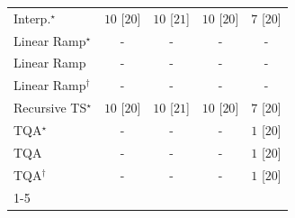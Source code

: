 \begin{tabular}{l|cccc|}
Interp.$^\star$ & {\cellcolor[HTML]{00441B}} \color[HTML]{F1F1F1} $10$ [$20$] & {\cellcolor[HTML]{00441B}} \color[HTML]{F1F1F1} $10$ [$21$] & {\cellcolor[HTML]{00441B}} \color[HTML]{F1F1F1} $10$ [$20$] & {\cellcolor[HTML]{37A055}} \color[HTML]{F1F1F1} $7$ [$20$] \\
Linear Ramp$^\star$ & {\cellcolor[HTML]{000000}} \color[HTML]{F1F1F1} {\cellcolor{white}} \color{black} - & {\cellcolor[HTML]{000000}} \color[HTML]{F1F1F1} {\cellcolor{white}} \color{black} - & {\cellcolor[HTML]{000000}} \color[HTML]{F1F1F1} {\cellcolor{white}} \color{black} - & {\cellcolor[HTML]{000000}} \color[HTML]{F1F1F1} {\cellcolor{white}} \color{black} - \\
Linear Ramp & {\cellcolor[HTML]{000000}} \color[HTML]{F1F1F1} {\cellcolor{white}} \color{black} - & {\cellcolor[HTML]{000000}} \color[HTML]{F1F1F1} {\cellcolor{white}} \color{black} - & {\cellcolor[HTML]{000000}} \color[HTML]{F1F1F1} {\cellcolor{white}} \color{black} - & {\cellcolor[HTML]{000000}} \color[HTML]{F1F1F1} {\cellcolor{white}} \color{black} - \\
Linear Ramp$^\dagger$ & {\cellcolor[HTML]{000000}} \color[HTML]{F1F1F1} {\cellcolor{white}} \color{black} - & {\cellcolor[HTML]{000000}} \color[HTML]{F1F1F1} {\cellcolor{white}} \color{black} - & {\cellcolor[HTML]{000000}} \color[HTML]{F1F1F1} {\cellcolor{white}} \color{black} - & {\cellcolor[HTML]{000000}} \color[HTML]{F1F1F1} {\cellcolor{white}} \color{black} - \\
Recursive TS$^\star$ & {\cellcolor[HTML]{00441B}} \color[HTML]{F1F1F1} $10$ [$20$] & {\cellcolor[HTML]{00441B}} \color[HTML]{F1F1F1} $10$ [$21$] & {\cellcolor[HTML]{00441B}} \color[HTML]{F1F1F1} $10$ [$20$] & {\cellcolor[HTML]{37A055}} \color[HTML]{F1F1F1} $7$ [$20$] \\
TQA$^\star$ & {\cellcolor[HTML]{000000}} \color[HTML]{F1F1F1} {\cellcolor{white}} \color{black} - & {\cellcolor[HTML]{000000}} \color[HTML]{F1F1F1} {\cellcolor{white}} \color{black} - & {\cellcolor[HTML]{000000}} \color[HTML]{F1F1F1} {\cellcolor{white}} \color{black} - & {\cellcolor[HTML]{F7FCF5}} \color[HTML]{000000} $1$ [$20$] \\
TQA & {\cellcolor[HTML]{000000}} \color[HTML]{F1F1F1} {\cellcolor{white}} \color{black} - & {\cellcolor[HTML]{000000}} \color[HTML]{F1F1F1} {\cellcolor{white}} \color{black} - & {\cellcolor[HTML]{000000}} \color[HTML]{F1F1F1} {\cellcolor{white}} \color{black} - & {\cellcolor[HTML]{F7FCF5}} \color[HTML]{000000} $1$ [$20$] \\
TQA$^\dagger$ & {\cellcolor[HTML]{000000}} \color[HTML]{F1F1F1} {\cellcolor{white}} \color{black} - & {\cellcolor[HTML]{000000}} \color[HTML]{F1F1F1} {\cellcolor{white}} \color{black} - & {\cellcolor[HTML]{000000}} \color[HTML]{F1F1F1} {\cellcolor{white}} \color{black} - & {\cellcolor[HTML]{F7FCF5}} \color[HTML]{000000} $1$ [$20$] \\
\cline{1-5}
\bottomrule
\end{tabular}

